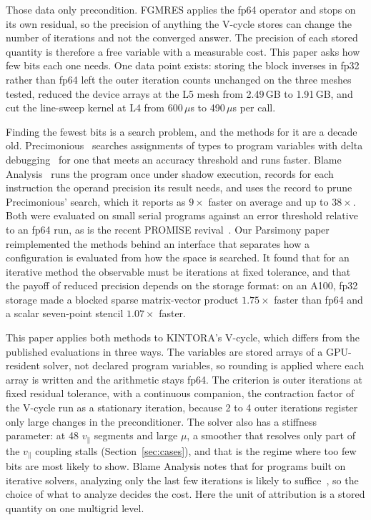 \documentclass[11pt]{article}
\newcommand{\vpar}{v_\parallel}
\begin{document}
Those data only precondition.  FGMRES applies the fp64 operator and stops on its own residual,
so the precision of anything the V-cycle stores can change the number of iterations and not the
converged answer.  The precision of each stored quantity is therefore a free variable with a
measurable cost.  This paper asks how few bits each one needs.  One data point exists:
storing the block inverses in fp32 rather than fp64 left the outer iteration counts unchanged on
the three meshes tested, reduced the device arrays at the L5 mesh from 2.49\,GB to 1.91\,GB, and
cut the line-sweep kernel at L4 from 600\,$\mu$s to 490\,$\mu$s per call.

Finding the fewest bits is a search problem, and the methods for it are a decade old.
Precimonious~\cite{precimonious} searches assignments of types to program variables with delta
debugging~\cite{ddmin} for one that meets an accuracy threshold and runs faster.  Blame
Analysis~\cite{blame} runs the program once under shadow execution, records for each instruction
the operand precision its result needs, and uses the record to prune Precimonious' search,
which it reports as $9\times$ faster on average and up to $38\times$.  Both were evaluated on
small serial programs against an error threshold relative to an fp64 run, as is the recent
PROMISE revival~\cite{promise2026}.  Our Parsimony paper~\cite{parsimony} reimplemented the
methods behind an interface that separates how a configuration is evaluated from how the space
is searched.  It found that for an iterative method the observable must be iterations at fixed
tolerance, and that the payoff of reduced precision depends on the storage format: on an A100,
fp32 storage made a blocked sparse matrix-vector product $1.75\times$ faster than fp64 and a
scalar seven-point stencil $1.07\times$ faster.

This paper applies both methods to KINTORA's V-cycle, which differs from the published
evaluations in three ways.  The variables are stored arrays of a GPU-resident solver, not
declared program variables, so rounding is applied where each array is written and the
arithmetic stays fp64.  The criterion is outer iterations at fixed residual tolerance, with a
continuous companion, the contraction factor of the V-cycle run as a stationary iteration,
because 2 to 4 outer iterations register only large changes in the preconditioner.  The solver
also has a stiffness parameter: at 48 $\vpar$ segments and large $\mu$, a smoother that resolves
only part of the $\vpar$ coupling stalls (Section~\ref{sec:cases}), and that is the regime where too
few bits are most likely to show.  Blame Analysis notes that for programs built on iterative
solvers, analyzing only the last few iterations is likely to suffice~\cite{blame}, so the choice
of what to analyze decides the cost.  Here the unit of attribution is a stored quantity on one
multigrid level.
\end{document}
